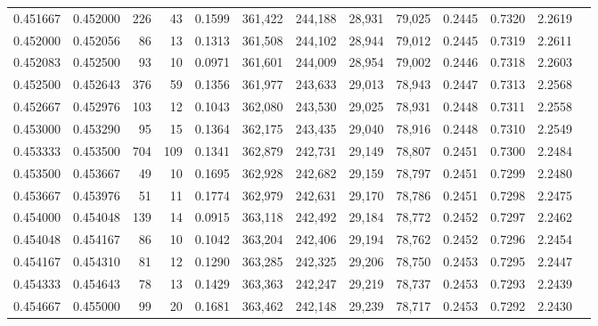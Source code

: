 \begin{tabular}{rrrrrrrrrrrrr}
0.451667 & 0.452000 &   226 &  43 &                                     0.1599 & 361,422 & 244,188 &  28,931 &  79,025 & 0.2445 & 0.7320 & 2.2619 \\
0.452000 & 0.452056 &    86 &  13 &                                     0.1313 & 361,508 & 244,102 &  28,944 &  79,012 & 0.2445 & 0.7319 & 2.2611 \\
0.452083 & 0.452500 &    93 &  10 &                                     0.0971 & 361,601 & 244,009 &  28,954 &  79,002 & 0.2446 & 0.7318 & 2.2603 \\
0.452500 & 0.452643 &   376 &  59 &                                     0.1356 & 361,977 & 243,633 &  29,013 &  78,943 & 0.2447 & 0.7313 & 2.2568 \\
0.452667 & 0.452976 &   103 &  12 &                                     0.1043 & 362,080 & 243,530 &  29,025 &  78,931 & 0.2448 & 0.7311 & 2.2558 \\
0.453000 & 0.453290 &    95 &  15 &                                     0.1364 & 362,175 & 243,435 &  29,040 &  78,916 & 0.2448 & 0.7310 & 2.2549 \\
0.453333 & 0.453500 &   704 & 109 &                                     0.1341 & 362,879 & 242,731 &  29,149 &  78,807 & 0.2451 & 0.7300 & 2.2484 \\
0.453500 & 0.453667 &    49 &  10 &                                     0.1695 & 362,928 & 242,682 &  29,159 &  78,797 & 0.2451 & 0.7299 & 2.2480 \\
0.453667 & 0.453976 &    51 &  11 &                                     0.1774 & 362,979 & 242,631 &  29,170 &  78,786 & 0.2451 & 0.7298 & 2.2475 \\
0.454000 & 0.454048 &   139 &  14 &                                     0.0915 & 363,118 & 242,492 &  29,184 &  78,772 & 0.2452 & 0.7297 & 2.2462 \\
0.454048 & 0.454167 &    86 &  10 &                                     0.1042 & 363,204 & 242,406 &  29,194 &  78,762 & 0.2452 & 0.7296 & 2.2454 \\
0.454167 & 0.454310 &    81 &  12 &                                     0.1290 & 363,285 & 242,325 &  29,206 &  78,750 & 0.2453 & 0.7295 & 2.2447 \\
0.454333 & 0.454643 &    78 &  13 &                                     0.1429 & 363,363 & 242,247 &  29,219 &  78,737 & 0.2453 & 0.7293 & 2.2439 \\
0.454667 & 0.455000 &    99 &  20 &                                     0.1681 & 363,462 & 242,148 &  29,239 &  78,717 & 0.2453 & 0.7292 & 2.2430 \\

\end{tabular}
